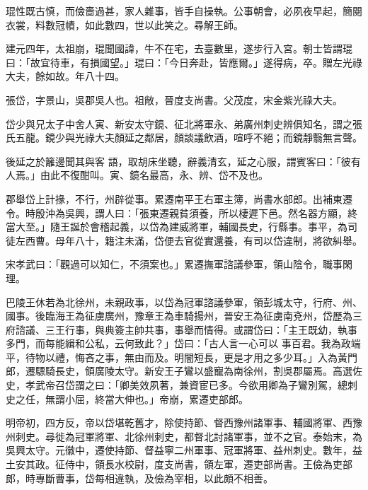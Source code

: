\begin{pinyinscope}
 琨性既古慎，而儉嗇過甚，家人雜事，皆手自操執。公事朝會，必夙夜早起，簡閱衣裳，料數冠幘，如此數四，世以此笑之。尋解王師。



 建元四年，太祖崩，琨聞國諱，牛不在宅，去臺數里，遂步行入宮。朝士皆謂琨曰：「故宜待車，有損國望。」琨曰：「今日奔赴，皆應爾。」遂得病，卒。贈左光祿大夫，餘如故。年八十四。



 張岱，字景山，吳郡吳人也。祖敞，晉度支尚書。父茂度，宋金紫光祿大夫。



 岱少與兄太子中舍人寅、新安太守鏡、征北將軍永、弟廣州刺史辨俱知名，謂之張氏五龍。鏡少與光祿大夫顏延之鄰居，顏談議飲酒，喧呼不絕；而鏡靜翳無言聲。



 後延之於籬邊聞其與客
 語，取胡床坐聽，辭義清玄，延之心服，謂賓客曰：「彼有人焉。」由此不復酣叫。寅、鏡名最高，永、辨、岱不及也。



 郡舉岱上計掾，不行，州辟從事。累遷南平王右軍主簿，尚書水部郎。出補東遷令。時殷沖為吳興，謂人曰：「張東遷親貧須養，所以棲遲下邑。然名器方顯，終當大至。」隨王誕於會稽起義，以岱為建威將軍，輔國長史，行縣事。事平，為司徒左西曹。母年八十，籍注未滿，岱便去官從實還養，有司以岱違制，將欲糾舉。



 宋孝武曰：「觀過可以知仁，不須案也。」累遷撫軍諮議參軍，領山陰令，職事閑理。



 巴陵王休若為北徐州，未親政事，以岱為冠軍諮議參軍，領彭城太守，行府、州、國事。後臨海王為征虜廣州，豫章王為車騎揚州，晉安王為征虜南兗州，岱歷為三府諮議、三王行事，與典簽主帥共事，事舉而情得。或謂岱曰：「主王既幼，執事多門，而每能緝和公私，云何致此？」岱曰：「古人言一心可以
 事百君。我為政端平，待物以禮，悔吝之事，無由而及。明闇短長，更是才用之多少耳。」入為黃門郎，遷驃騎長史，領廣陵太守。新安王子鸞以盛寵為南徐州，割吳郡屬焉。高選佐史，孝武帝召岱謂之曰：「卿美效夙著，兼資宦已多。今欲用卿為子鸞別駕，總刺史之任，無謂小屈，終當大伸也。」帝崩，累遷吏部郎。



 明帝初，四方反，帝以岱堪乾舊才，除使持節、督西豫州諸軍事、輔國將軍、西豫州刺史。尋徙為冠軍將軍、北徐州刺史，都督北討諸軍事，並不之官。泰始末，為吳興太守。元徽中，遷使持節、督益寧二州軍事、冠軍將軍、益州刺史。數年，益土安其政。征侍中，領長水校尉，度支尚書，領左軍，遷吏部尚書。王儉為吏部郎，時專斷曹事，岱每相違執，及儉為宰相，以此頗不相善。




\end{pinyinscope}
